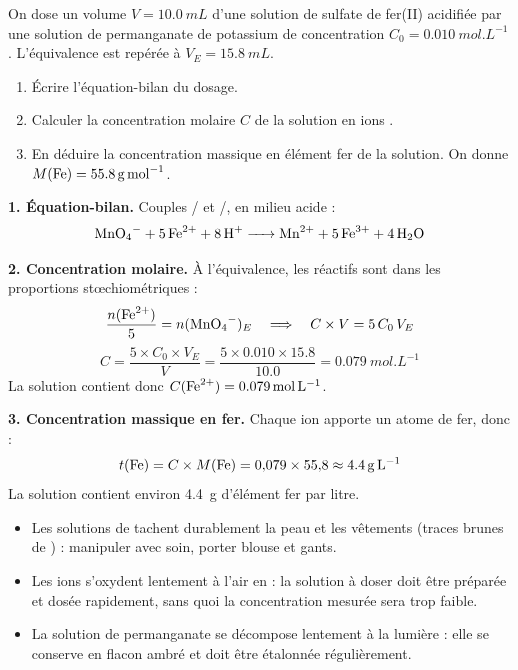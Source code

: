 \documentclass[11pt]{article}
\begin{document}
\begin{exoresolu}
On dose un volume $V = \SI{10,0}{mL}$ d'une solution de sulfate de fer(II) acidifiée par une solution de permanganate de potassium de concentration $C_0 = \SI{0,010}{mol.L^{-1}}$. L'équivalence est repérée à $V_E = \SI{15,8}{mL}$.
\begin{enumerate}
\item Écrire l'équation-bilan du dosage.
\item Calculer la concentration molaire $C$ de la solution en ions .
\item En déduire la concentration massique en élément fer de la solution. On donne $M(\ce{Fe}) = \SI{55,8}{g.mol^{-1}}$.
\end{enumerate}
\tcblower
\textbf{1. Équation-bilan.} Couples / et /, en milieu acide :
\[ \ce{MnO4- + 5 Fe^2+ + 8 H+ -> Mn^2+ + 5 Fe^3+ + 4 H2O} \]

\textbf{2. Concentration molaire.} À l'équivalence, les réactifs sont dans les proportions stœchiométriques :
\[ \frac{n(\ce{Fe^2+})}{5} = n(\ce{MnO4-})_E \quad\Longrightarrow\quad C \times V = 5 \, C_0 \, V_E \]
\[ C = \frac{5 \times C_0 \times V_E}{V} = \frac{5 \times \num{0,010} \times \num{15,8}}{\num{10,0}} = \SI{0,079}{mol.L^{-1}} \]
La solution contient donc $C(\ce{Fe^2+}) = \SI{0,079}{mol.L^{-1}}$.

\textbf{3. Concentration massique en fer.} Chaque ion  apporte un atome de fer, donc :
\[ t(\ce{Fe}) = C \times M(\ce{Fe}) = 0{,}079 \times 55{,}8 \approx \SI{4,4}{g.L^{-1}} \]
La solution contient environ \SI{4,4}{g} d'élément fer par litre.
\end{exoresolu}

\begin{attention}
\begin{itemize}
\item Les solutions de  tachent durablement la peau et les vêtements (traces brunes de ) : manipuler avec soin, porter blouse et gants.
\item Les ions  s'oxydent lentement à l'air en  : la solution à doser doit être préparée et dosée rapidement, sans quoi la concentration mesurée sera trop faible.
\item La solution de permanganate se décompose lentement à la lumière : elle se conserve en flacon ambré et doit être étalonnée régulièrement.
\end{itemize}
\end{attention}
\end{document}
